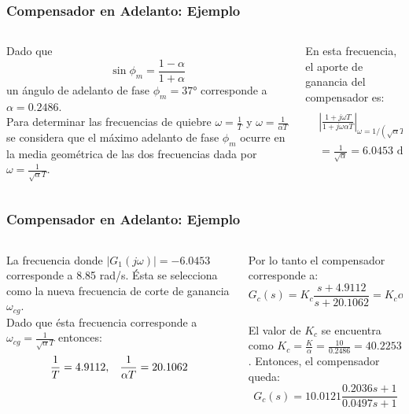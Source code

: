 \documentclass[aspectratio=169, handout]{beamer}
\theoremstyle{definition}
\theoremstyle{plain}
\theoremstyle{remark}
\begin{document}
\begin{frame}[<+->]\frametitle{Compensador en Adelanto: Ejemplo}
\vspace*{5mm}
\begin{columns}
	\begin{column}{0.5\textwidth}		
	Dado que
	\begin{equation*}
		\sin \phi_m = \frac{1-\alpha}{1+\alpha}
	\end{equation*}
	un ángulo de adelanto de fase $\phi_m = \ang{37}$ corresponde a $\alpha = 0.2486$.
	\pause\\
	\vspace*{3mm}
	Para determinar las frecuencias de quiebre $\omega = \frac{1}{T}$ y $\omega = \frac{1}{\alpha T}$ se considera que el máximo adelanto de fase $\phi_m$ ocurre en la media geométrica de las dos frecuencias dada por $\omega = \frac{1}{\sqrt{\alpha}T}$.
	\pause
	\end{column}
	\begin{column}{0.5\textwidth}
	En esta frecuencia, el aporte de ganancia del compensador es:
	\begin{align*}
		&\left| \frac{1+j\omega T}{1 + j\omega \alpha T} \right|_{\omega = 1/(\sqrt{\alpha}T)} = \left| \frac{1+j\frac{1}{\sqrt{\alpha}}}{1+j\alpha\frac{1}{\sqrt{\alpha}}} \right|\\
		 &= \frac{1}{\sqrt{\alpha}} = 6.0453 \text{ dB}
	\end{align*}
	\end{column}
\end{columns}
\end{frame}

\begin{frame}[<+->]\frametitle{Compensador en Adelanto: Ejemplo}
\begin{columns}
	\begin{column}{0.5\textwidth}
	La frecuencia donde $|G_1(j\omega)| = -6.0453$ corresponde a 8.85 rad/s. Ésta se selecciona como la nueva frecuencia de corte de ganancia $\omega_{cg}$.
	\pause\\
	\vspace*{3mm}
	Dado que ésta frecuencia corresponde a $\omega_{cg} = \frac{1}{\sqrt{\alpha}T}$ entonces:
	\begin{equation*}
		 \frac{1}{T} = 4.9112,\hspace*{3mm} \frac{1}{\alpha T} = 20.1062
	\end{equation*}
	\pause
	\end{column}
	\begin{column}{0.5\textwidth}
	Por lo tanto el compensador corresponde a:
	\begin{equation*}
		G_c(s) = K_c\frac{s+4.9112}{s+20.1062} = K_c \alpha \frac{0.2036s + 1}{0.0497s + 1}
	\end{equation*}
	\pause\\
	El valor de $K_c$ se encuentra como $K_c = \frac{K}{\alpha} = \frac{10}{0.2486} = 40.2253$. Entonces, el compensador queda:
	\begin{equation*}
		G_c(s) = 10.0121 \frac{0.2036s + 1}{0.0497s + 1}
	\end{equation*}
	\end{column}
\end{columns}
\end{frame}
\end{document}
